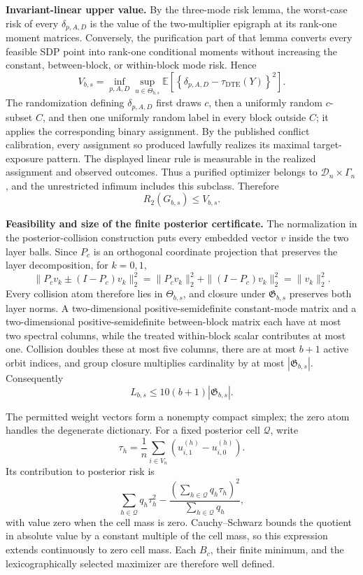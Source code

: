 \textbf{Invariant-linear upper value.}
By the three-mode risk lemma, the worst-case risk of every \(\delta_{p,A,D}\) is the value of the two-multiplier epigraph at its rank-one moment matrices.  Conversely, the purification part of that lemma converts every feasible SDP point into rank-one conditional moments without increasing the constant, between-block, or within-block mode risk.  Hence
\[
V_{b,s}
=\inf_{p,A,D}\sup_{u\in\Theta_{b,s}}
\mathbb E\!\left[\left\{\delta_{p,A,D}-\tau_{\mathrm{DTE}}(Y)\right\}^2\right].
\]
The randomization defining \(\delta_{p,A,D}\) first draws \(c\), then a uniformly random \(c\)-subset \(C\), and then one uniformly random label in every block outside \(C\); it applies the corresponding binary assignment.  By the published conflict calibration, every assignment so produced lawfully realizes its maximal target-exposure pattern.  The displayed linear rule is measurable in the realized assignment and observed outcomes.  Thus a purified optimizer belongs to \(\mathcal D_n\times\Gamma_n\), and the unrestricted infimum includes this subclass.  Therefore
\[
R_2(G_{b,s})\leq V_{b,s}.
\]

\textbf{Feasibility and size of the finite posterior certificate.}
The normalization in the posterior-collision construction puts every embedded vector \(v\) inside the two layer balls.  Since \(P_c\) is an orthogonal coordinate projection that preserves the layer decomposition, for \(k=0,1\),
\[
\bigl\|P_cv_k\mathbin{\pm}(I-P_c)v_k\bigr\|_2^2
=\|P_cv_k\|_2^2+\|(I-P_c)v_k\|_2^2
=\|v_k\|_2^2.
\]
Every collision atom therefore lies in \(\Theta_{b,s}\), and closure under \(\mathfrak G_{b,s}\) preserves both layer norms.  A two-dimensional positive-semidefinite constant-mode matrix and a two-dimensional positive-semidefinite between-block matrix each have at most two spectral columns, while the treated within-block scalar contributes at most one.  Collision doubles these at most five columns, there are at most \(b+1\) active orbit indices, and group closure multiplies cardinality by at most \(|\mathfrak G_{b,s}|\).  Consequently
\[
L_{b,s}\leq10(b+1)|\mathfrak G_{b,s}|.
\]

The permitted weight vectors form a nonempty compact simplex; the zero atom handles the degenerate dictionary.  For a fixed posterior cell \(\mathcal Q\), write
\[
\tau_h=\frac1n\sum_{i\in V_n}(u^{(h)}_{i,1}-u^{(h)}_{i,0}).
\]
Its contribution to posterior risk is
\[
\sum_{h\in\mathcal Q}q_h\tau_h^2
-\frac{\left(\sum_{h\in\mathcal Q}q_h\tau_h\right)^2}
{\sum_{h\in\mathcal Q}q_h},
\]
with value zero when the cell mass is zero.  Cauchy--Schwarz bounds the quotient in absolute value by a constant multiple of the cell mass, so this expression extends continuously to zero cell mass.  Each \(B_c\), their finite minimum, and the lexicographically selected maximizer are therefore well defined.

